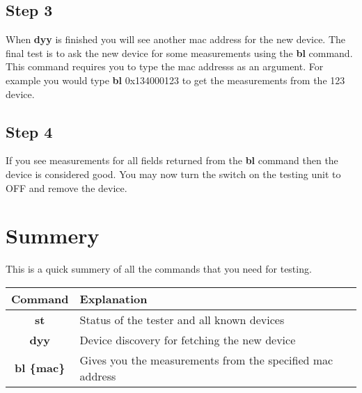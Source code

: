 \documentclass[a4paper,11pt]{article}
\begin{document}
\subsection*{Step 3}
When \textbf{dyy} is finished you will see another mac address for the new device. The final test is to ask the new device for some measurements using the \textbf{bl} command. This command requires you to type the mac addresss as an argument. For example you would type \textbf{bl} 0x134000123 to get the measurements from the 123 device.
\subsection*{Step 4}
If you see measurements for all fields returned from the \textbf{bl} command then the device is considered good. You may now turn the switch on the testing unit to OFF and remove the device.

\section*{Summery}
This is a quick summery of all the commands that you need for testing.
~\newline

\begin{tabular}{| c | l |}
\hline
\textbf{Command} & \textbf{Explanation} \\
\hline
\textbf{st} & Status of the tester and all known devices \\
\textbf{dyy} & Device discovery for fetching the new device \\
\textbf{bl \{mac\}} & Gives you the measurements from the specified mac address \\
\hline
\end{tabular}
\end{document}
